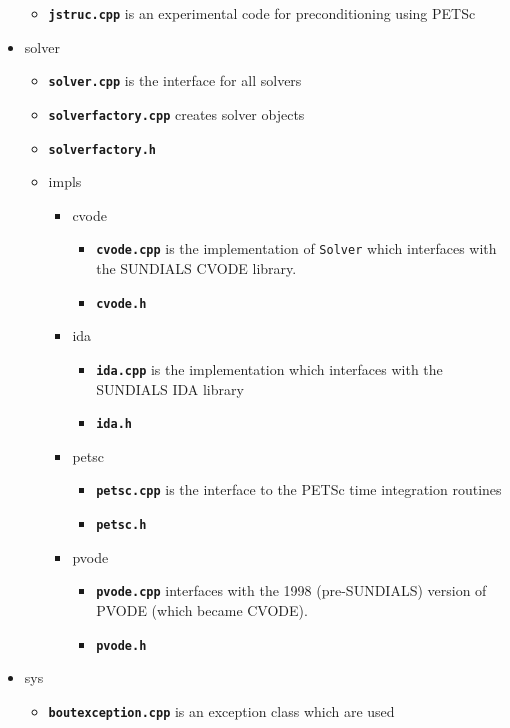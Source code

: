 \documentclass[12pt]{article}
\newcommand{\code}[1]{\texttt{#1}}
\newcommand{\file}[1]{\texttt{\bf #1}}
\begin{document}
\begin{itemize}
  \begin{itemize}
  \item \file{jstruc.cpp} is an experimental code for preconditioning using
    PETSc
  \end{itemize}
\item solver
  \begin{itemize}
  \item \file{solver.cpp} is the interface for all solvers 
  \item \file{solverfactory.cpp} creates solver objects
  \item \file{solverfactory.h}
  \item impls
    \begin{itemize}
    \item cvode
      \begin{itemize}
      \item \file{cvode.cpp} is the implementation of \code{Solver} which
        interfaces with the SUNDIALS CVODE library.
      \item \file{cvode.h}
      \end{itemize}
    \item ida
      \begin{itemize}
      \item \file{ida.cpp} is the implementation which interfaces with the
        SUNDIALS IDA library
      \item \file{ida.h}
      \end{itemize}
    \item petsc
      \begin{itemize}
      \item \file{petsc.cpp} is the interface to the PETSc time integration
        routines
      \item \file{petsc.h}
      \end{itemize}
    \item pvode
      \begin{itemize}
      \item \file{pvode.cpp} interfaces with the 1998 (pre-SUNDIALS) version
        of PVODE (which became CVODE).
      \item \file{pvode.h}
      \end{itemize}
    \end{itemize}
  \end{itemize}
\item sys
  \begin{itemize}
  \item \file{boutexception.cpp} is an exception class which are used

\end{itemize}
\end{itemize}
\end{document}
